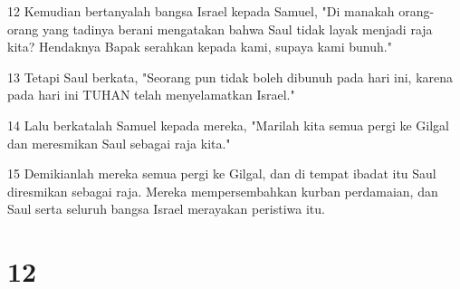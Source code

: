 \par 12 Kemudian bertanyalah bangsa Israel kepada Samuel, "Di manakah orang-orang yang tadinya berani mengatakan bahwa Saul tidak layak menjadi raja kita? Hendaknya Bapak serahkan kepada kami, supaya kami bunuh."
\par 13 Tetapi Saul berkata, "Seorang pun tidak boleh dibunuh pada hari ini, karena pada hari ini TUHAN telah menyelamatkan Israel."
\par 14 Lalu berkatalah Samuel kepada mereka, "Marilah kita semua pergi ke Gilgal dan meresmikan Saul sebagai raja kita."
\par 15 Demikianlah mereka semua pergi ke Gilgal, dan di tempat ibadat itu Saul diresmikan sebagai raja. Mereka mempersembahkan kurban perdamaian, dan Saul serta seluruh bangsa Israel merayakan peristiwa itu.

\chapter{12}

